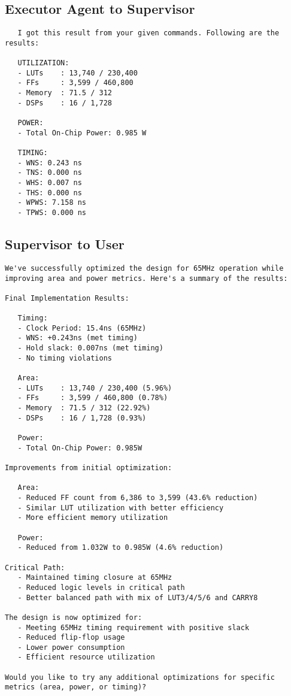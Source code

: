 \subsection{Executor Agent to Supervisor}
\vspace{-0.5em}
\begin{reviewerbox}
\begin{lstlisting}
   I got this result from your given commands. Following are the results:

   UTILIZATION:
   - LUTs    : 13,740 / 230,400
   - FFs     : 3,599 / 460,800
   - Memory  : 71.5 / 312
   - DSPs    : 16 / 1,728

   POWER:
   - Total On-Chip Power: 0.985 W

   TIMING:
   - WNS: 0.243 ns
   - TNS: 0.000 ns
   - WHS: 0.007 ns
   - THS: 0.000 ns
   - WPWS: 7.158 ns
   - TPWS: 0.000 ns
\end{lstlisting}
\end{reviewerbox}


\subsection{Supervisor to User}
\vspace{-0.5em}
\begin{supervisorbox}
\begin{lstlisting}
We've successfully optimized the design for 65MHz operation while improving area and power metrics. Here's a summary of the results:

Final Implementation Results:

   Timing:
   - Clock Period: 15.4ns (65MHz)
   - WNS: +0.243ns (met timing)
   - Hold slack: 0.007ns (met timing)
   - No timing violations

   Area:
   - LUTs    : 13,740 / 230,400 (5.96%)
   - FFs     : 3,599 / 460,800 (0.78%)
   - Memory  : 71.5 / 312 (22.92%)
   - DSPs    : 16 / 1,728 (0.93%)

   Power:
   - Total On-Chip Power: 0.985W

Improvements from initial optimization:

   Area:
   - Reduced FF count from 6,386 to 3,599 (43.6% reduction)
   - Similar LUT utilization with better efficiency
   - More efficient memory utilization

   Power:
   - Reduced from 1.032W to 0.985W (4.6% reduction)

Critical Path:
   - Maintained timing closure at 65MHz
   - Reduced logic levels in critical path
   - Better balanced path with mix of LUT3/4/5/6 and CARRY8

The design is now optimized for:
   - Meeting 65MHz timing requirement with positive slack
   - Reduced flip-flop usage
   - Lower power consumption
   - Efficient resource utilization

Would you like to try any additional optimizations for specific metrics (area, power, or timing)?
\end{lstlisting}
\end{supervisorbox}
